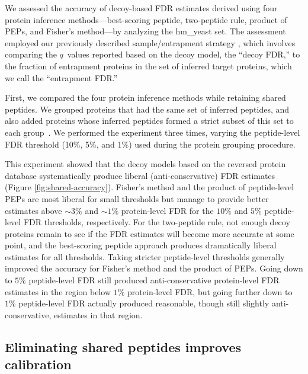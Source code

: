 \documentclass{article}
\begin{document}
We assessed the accuracy of decoy-based FDR estimates derived using
four protein inference methods---best-scoring peptide, two-peptide
rule, product of PEPs, and Fisher's method---by analyzing the
hm\_yeast set.  The assessment employed our previously described
sample/entrapment strategy \cite{granholm2013determining}, which
involves comparing the $q$~values reported based on the decoy model,
the ``decoy FDR,'' to the fraction of entrapment proteins in the set
of inferred target proteins, which we call the ``entrapment FDR.''

First, we compared the four protein inference methods while retaining
shared peptides. We grouped proteins that had the same set of
inferred peptides, and also added proteins whose inferred peptides
formed a strict subset of this set to each
group~\cite{nesvizhskii2005interpretation, serang2012review}.  We
performed the experiment three times, varying the peptide-level FDR
threshold (10\%, 5\%, and 1\%) used during the protein grouping
procedure.

This experiment showed that the decoy models based on the reversed 
protein database systematically produce liberal (anti-conservative) 
FDR estimates (Figure \ref{fig:shared-accuracy}). Fisher's method and 
the product of peptide-level PEPs are most liberal for small 
thresholds but manage to provide better estimates above ${\sim}3\%$ 
and ${\sim}1\%$ protein-level FDR for the $10\%$ and $5\%$ 
peptide-level FDR thresholds, respectively. For the two-peptide rule, 
not enough decoy proteins remain to see if the FDR estimates will 
become more accurate at some point, and the best-scoring peptide 
approach produces dramatically liberal estimates for all thresholds. 
Taking stricter peptide-level thresholds generally improved the 
accuracy for Fisher's method and the product of PEPs. Going down to 
$5\%$ peptide-level FDR still produced anti-conservative protein-level 
FDR estimates in the region below $1\%$ protein-level FDR, but going 
further down to $1\%$ peptide-level FDR actually produced reasonable, 
though still slightly anti-conservative, estimates in that region.

\subsection*{Eliminating shared peptides improves calibration}
\end{document}
